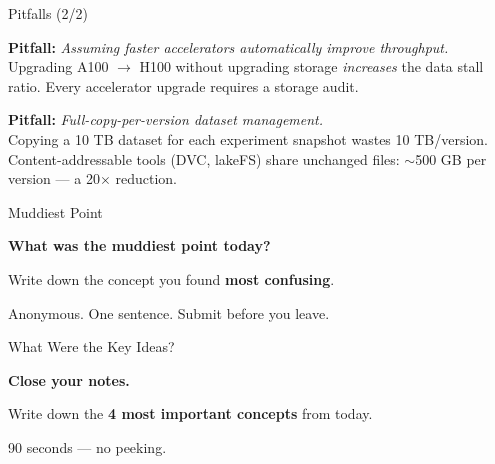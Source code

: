 \documentclass[aspectratio=169, 12pt]{beamer}
\begin{document}
\begin{frame}{Pitfalls (2/2)}

\small
\textbf{Pitfall:} \textit{Assuming faster accelerators automatically improve throughput.}\\
{\footnotesize Upgrading A100 $\to$ H100 without upgrading storage \emph{increases} the data stall ratio. Every accelerator upgrade requires a storage audit.}

\vspace{0.15cm}
\textbf{Pitfall:} \textit{Full-copy-per-version dataset management.}\\
{\footnotesize Copying a 10 TB dataset for each experiment snapshot wastes 10 TB/version. Content-addressable tools (DVC, lakeFS) share unchanged files: $\sim$500 GB per version --- a 20$\times$ reduction.}

\end{frame}


\begin{frame}{Muddiest Point}
\note{
[1 min]
}

\centering
\vspace{1.0cm}
{\Large\bfseries What was the \alert{muddiest point} today?}

\vspace{0.8cm}
{\normalsize Write down the concept you found \textbf{most confusing}.}

\vspace{0.5cm}
{\small\textcolor{midgray}{Anonymous. One sentence. Submit before you leave.}}

\end{frame}

\begin{frame}{What Were the Key Ideas?}

\centering
\vspace{1.5cm}
{\Large\bfseries Close your notes.}

\vspace{0.8cm}
{\large Write down the \textbf{4 most important concepts} from today.}

\vspace{0.8cm}
{\normalsize\textcolor{midgray}{90 seconds --- no peeking.}}

\end{frame}
\end{document}
